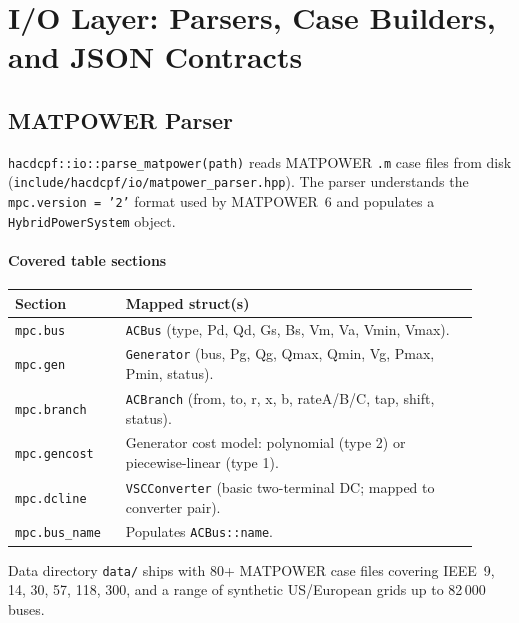 \section{I/O Layer: Parsers, Case Builders, and JSON Contracts}
\label{sec:io}

\subsection{MATPOWER Parser}
\label{sec:matpower-parser}

\texttt{hacdcpf::io::parse\_matpower(path)} reads MATPOWER \texttt{.m} case files
from disk (\texttt{include/hacdcpf/io/matpower\_parser.hpp}).  The parser
understands the \texttt{mpc.version~=~'2'} format used by MATPOWER~6 and
populates a \texttt{HybridPowerSystem} object.

\paragraph{Covered table sections}
\begin{longtable}{L{0.22\linewidth}L{0.70\linewidth}}
\toprule
Section & Mapped struct(s) \\
\midrule
\endhead
\texttt{mpc.bus} & \texttt{ACBus} (type, Pd, Qd, Gs, Bs, Vm, Va, Vmin, Vmax). \\
\texttt{mpc.gen} & \texttt{Generator} (bus, Pg, Qg, Qmax, Qmin, Vg, Pmax, Pmin, status). \\
\texttt{mpc.branch} & \texttt{ACBranch} (from, to, r, x, b, rateA/B/C, tap, shift, status). \\
\texttt{mpc.gencost} & Generator cost model: polynomial (type 2) or piecewise-linear (type 1). \\
\texttt{mpc.dcline} & \texttt{VSCConverter} (basic two-terminal DC; mapped to converter pair). \\
\texttt{mpc.bus\_name} & Populates \texttt{ACBus::name}. \\
\bottomrule
\end{longtable}

Data directory \texttt{data/} ships with 80+ MATPOWER case files covering
IEEE~9, 14, 30, 57, 118, 300, and a range of synthetic US/European grids up to
82\,000 buses.


